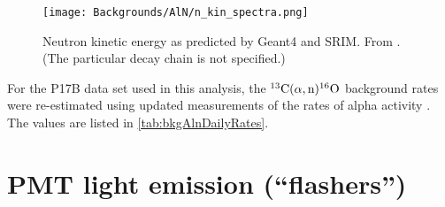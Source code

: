 \documentclass[../thesis.tex]{subfiles}
\begin{document}
\begin{figure}[ht]
  \texttt{[image: Backgrounds/AlN/n\_kin\_spectra.png]}
  \caption{Neutron kinetic energy as predicted by Geant4 and SRIM. From \cite{Zhao_2014}. (The particular decay chain is not specified.)}
  \label{fig:aln_n_kin_spectra}
\end{figure}

For the P17B data set used in this analysis, the $\CanO$ background rates were re-estimated using updated measurements of the rates of alpha activity \cite{lianghongBkg}. The values are listed in \autoref{tab:bkgAlnDailyRates}.

\begin{table}[ht]
  \caption{$\CanO$ background rates for the P17B data set \cite{lianghongBkg}.}
  \label{tab:bkgAlnDailyRates}
\end{table}

\section{PMT light emission (``flashers'')}
\label{sec:bkgFlashers}
\end{document}
